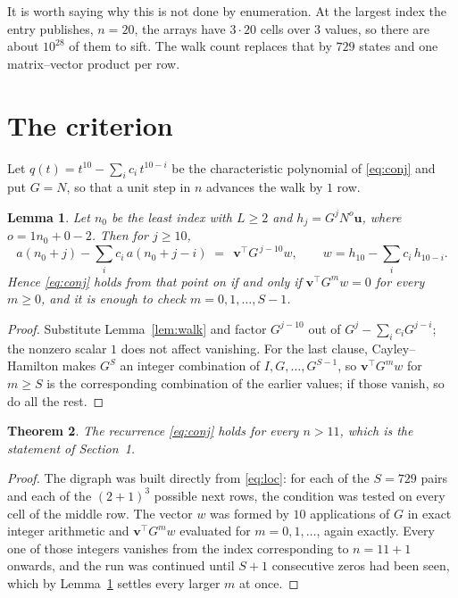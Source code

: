 \documentclass[11pt,a4paper]{article}
\theoremstyle{plain}
\newtheorem{theorem}{Theorem}
\newtheorem{lemma}[theorem]{Lemma}
\theoremstyle{definition}
\begin{document}
It is worth saying why this is not done by enumeration. At the largest index the entry
publishes, $n=20$, the arrays have $3\cdot20$ cells over
$3$ values, so there are about $10^{28}$ of them to sift. The
walk count replaces that by $729$ states and one matrix--vector product per row.
\section{The criterion}

Let $q(t)=t^{10}-\sum_i c_i\,t^{10-i}$ be the characteristic polynomial of
\eqref{eq:conj} and put $G=N$, so that a unit step in $n$ advances the walk by
$1$ row.

\begin{lemma}\label{lem:crit}
Let $n_0$ be the least index with $L\ge2$ and $h_j=G^{j}N^{o}\mathbf{u}$, where
$o=1n_0+0-2$. Then for $j\ge10$,
\[
a(n_0+j)-\sum_i c_i\,a(n_0+j-i)\;=\;\,\mathbf{v}^{\!\top}G^{\,j-10}w,
\qquad w=h_{10}-\sum_i c_i\,h_{10-i} .
\]
Hence \eqref{eq:conj} holds from that point on if and only if
$\mathbf{v}^{\!\top}G^{m}w=0$ for every $m\ge0$, and it is enough to check
$m=0,1,\dots,S-1$.
\end{lemma}

\begin{proof}
Substitute Lemma~\ref{lem:walk} and factor $G^{j-10}$ out of
$G^{j}-\sum_ic_iG^{j-i}$; the nonzero scalar $1$ does not affect
vanishing. For the last clause, Cayley--Hamilton makes $G^{S}$ an integer combination of
$I,G,\dots,G^{S-1}$, so $\mathbf{v}^{\!\top}G^{m}w$ for $m\ge S$ is the corresponding
combination of the earlier values; if those vanish, so do all the rest.
\end{proof}

\begin{theorem}
The recurrence \eqref{eq:conj} holds for every $n>11$, which is the statement of
Section~1.
\end{theorem}

\begin{proof}
The digraph was built directly from \eqref{eq:loc}: for each of the $S=729$ pairs and each
of the $(2+1)^{3}$ possible next rows, the condition was tested on every cell of
the middle row. The vector $w$ was formed by $10$ applications of $G$ in exact integer
arithmetic and $\mathbf{v}^{\!\top}G^{m}w$ evaluated for $m=0,1,\dots$, again exactly.
Every one of those integers vanishes from the index corresponding to $n=11+1$ onwards,
and the run was continued until $S+1$ consecutive zeros had been seen, which by
Lemma~\ref{lem:crit} settles every larger $m$ at once.
\end{proof}
\end{document}

